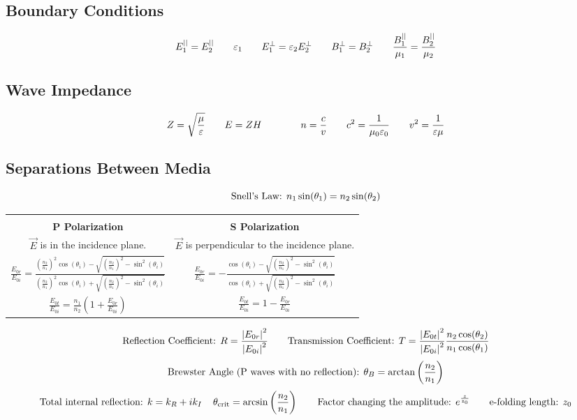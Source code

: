 \documentclass{article}
\begin{document}
\subsection*{Boundary Conditions}
\[E_1^{||}=E_2^{||}\hspace{7 mm}\varepsilon_1\hspace{7 mm}E_1^\perp=\varepsilon_2E_2^\perp\hspace{7 mm}B_1^\perp=B_2^\perp\hspace{7 mm}\frac{B_1^{||}}{\mu_1}=\frac{B_2^{||}}{\mu_2}\]
\subsection*{Wave Impedance}
\[Z=\sqrt{\frac{\mu}{\varepsilon}}\hspace{7 mm}E=ZH\hspace{7 mm}\hspace{7 mm}n=\frac{c}{v}\hspace{7 mm}c^2=\frac{1}{\mu_0\varepsilon_0}\hspace{7 mm}v^2=\frac{1}{\varepsilon\mu}\]
\subsection*{Separations Between Media}
\[\textnormal{Snell's Law: }n_1\sin(\theta_1)=n_2\sin(\theta_2)\]
\begin{center}
\begin{tabular}{|| c c ||}
\hline
&\\
\textbf{P Polarization} & \textbf{S Polarization} \\[10pt]
\(\overrightarrow{E}\) is in the incidence plane. & \(\overrightarrow{E}\) is perpendicular to the incidence plane.\\[10pt]
\(\frac{E_{0r}}{E_{0i}}=\frac{\left(\frac{n_2}{n_1}\right)^2\cos(\theta_i)-\sqrt{\left(\frac{n_2}{n_1}\right)^2-\sin^2(\theta_i)}}{\left(\frac{n_2}{n_1}\right)^2\cos(\theta_i)+\sqrt{\left(\frac{n_2}{n_1}\right)^2-\sin^2(\theta_i)}}\) & \(\frac{E_{0r}}{E_{0i}}=-\frac{\cos(\theta_i)-\sqrt{\left(\frac{n_2}{n_1}\right)^2-\sin^2(\theta_i)}}{\cos(\theta_i)+\sqrt{\left(\frac{n_2}{n_1}\right)^2-\sin^2(\theta_i)}}\)\\[15pt]
\(\frac{E_{0t}}{E_{0i}}=\frac{n_1}{n_2}\left(1+\frac{E_{0r}}{E_{0i}}\right)\) & \(\frac{E_{0t}}{E_{0i}}=1-\frac{E_{0r}}{E_{0i}}\) \\[10pt]
\hline
\end{tabular}
\end{center}
\[\textnormal{Reflection Coefficient: }R=\frac{\left|E_{0r}\right|^2}{\left|E_{0i}\right|^2}\hspace{7 mm}\textnormal{Transmission Coefficient: }T=\frac{\left|E_{0t}\right|^2}{\left|E_{0i}\right|^2}\frac{n_2\cos(\theta_2)}{n_1\cos(\theta_1)}\]
\[\textnormal{Brewster Angle (P waves with no reflection): } \theta_B=\arctan\left(\frac{n_2}{n_1}\right)\]
\[\textnormal{Total internal reflection: }k=k_R+ik_I\hspace{4 mm}\theta_\textnormal{crit}=\arcsin\left(\frac{n_2}{n_1}\right)\hspace{7 mm}\textnormal{Factor changing the amplitude: }e^{\frac{z}{z_0}}\hspace{7 mm}\textnormal{e-folding length: }z_0\]
\end{document}
